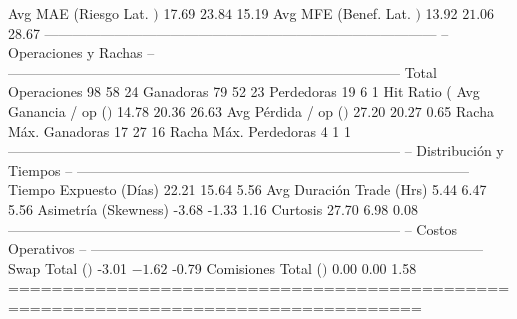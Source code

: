   Avg MAE (Riesgo Lat. $)     $          17.69  $          23.84  $          15.19
  Avg MFE (Benef. Lat. $)     $          13.92  $          21.06  $          28.67
------------------------------------------------------------------------------------
  -- Operaciones y Rachas --
------------------------------------------------------------------------------------
  Total Operaciones                         98                58                24
  Ganadoras                                 79                52                23
  Perdedoras                                19                 6                 1
  Hit Ratio (%
  Avg Ganancia / op ($)       $          14.78  $          20.36  $          26.63
  Avg Pérdida / op ($)        $          27.20  $          20.27  $           0.65
  Racha Máx. Ganadoras                      17                27                16
  Racha Máx. Perdedoras                      4                 1                 1
------------------------------------------------------------------------------------
  -- Distribución y Tiempos --
------------------------------------------------------------------------------------
  Tiempo Expuesto (Días)                 22.21             15.64              5.56
  Avg Duración Trade (Hrs)                5.44              6.47              5.56
  Asimetría (Skewness)                   -3.68             -1.33              1.16
  Curtosis                               27.70              6.98              0.08
------------------------------------------------------------------------------------
  -- Costos Operativos --
------------------------------------------------------------------------------------
  Swap Total ($)              $          -3.01  $          -1.62  $          -0.79
  Comisiones Total ($)        $           0.00  $           0.00  $           1.58
====================================================================================

